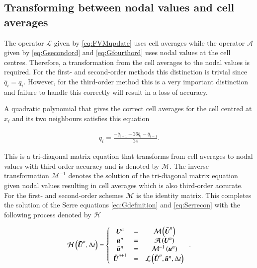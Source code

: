 \documentclass[SingleSpace,12pt,Proceedings]{Serre_ASCE}
\begin{document}
\subsection{Transforming between nodal values and cell averages} %
The operator $\mathcal{L}$ given by \eqref{eq:FVMupdate} uses cell averages while the operator $\mathcal{A}$ given by \eqref{eq:Gsecondord} and \eqref{eq:Gfourthord} uses nodal values at the cell centres. Therefore, a transformation from the cell averages to the nodal values is required. For the first- and second-order methods this distinction is trivial since $\bar{q}_i = q_i$. However, for the third-order method this is a very important distinction and failure to handle this correctly will result in a loss of accuracy. 

A quadratic polynomial that gives the correct cell averages for the cell centred at $x_i$ and its two neighbours satisfies this equation
\begin{linenomath*}
\begin{gather*} %
q_i = \frac{- \bar{q}_{i+1} + 26\bar{q}_{i} - \bar{q}_{i-1}}{24}.
\end{gather*}
\end{linenomath*}
This is a tri-diagonal matrix equation that transforms from cell averages to nodal values with third-order accuracy and is denoted by $\mathcal{M}$. The inverse transformation $\mathcal{M}^{-1}$ denotes the solution of the tri-diagonal matrix equation given nodal values resulting in cell averages which is also third-order accurate. For the first- and second-order schemes $\mathcal{M}$ is the identity matrix. This completes the solution of the Serre equations \eqref{eq:Gdefinition} and \eqref{eq:Serrecon} with the following process denoted by $\mathcal{H}$
\begin{linenomath*}
\begin{gather*}
\mathcal{H}\left(\boldsymbol{\bar{U}}^n,\Delta t \right) = \left\lbrace 
\begin{array}{c c c} 
	\boldsymbol{U}^n &=& \mathcal{M}\left(\boldsymbol{\bar{U}}^n\right) \\
	\boldsymbol{u}^n &=& \mathcal{A}\left(\boldsymbol{U}^n\right) \\
	\boldsymbol{\bar{u}}^n &=&  \mathcal{M}^{-1}\left(\boldsymbol{u}^n\right) \\
	\boldsymbol{\bar{U}}^{n+1} &=& \mathcal{L}\left(\boldsymbol{\bar{U}}^{n},\boldsymbol{\bar{u}}^n,\Delta t\right)							
\end{array} \right. .
\end{gather*}
\end{linenomath*}
\end{document}
